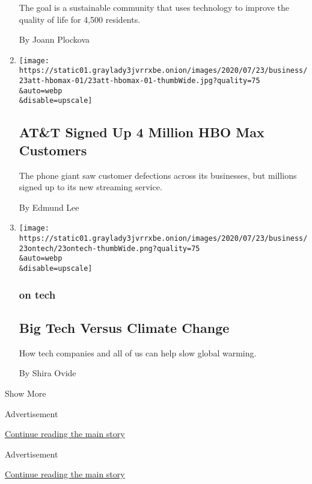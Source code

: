 \begin{enumerate}
  The goal is a sustainable community that uses technology to improve
  the quality of life for 4,500 residents.

  By Joann Plockova
\item
  \href{/2020/07/23/business/media/att-hbo-max.html}{}

  \texttt{[image: https://static01.graylady3jvrrxbe.onion/images/2020/07/23/business/23att-hbomax-01/23att-hbomax-01-thumbWide.jpg?quality=75\\\&auto=webp\\\&disable=upscale]}

  \hypertarget{att-signed-up-4-million-hbo-max-customers}{%
  \subsection{AT\&T Signed Up 4 Million HBO Max
  Customers}\label{att-signed-up-4-million-hbo-max-customers}}

  The phone giant saw customer defections across its businesses, but
  millions signed up to its new streaming service.

  By Edmund Lee
\item
  \href{/2020/07/23/technology/big-tech-climate-change.html}{}

  \texttt{[image: https://static01.graylady3jvrrxbe.onion/images/2020/07/23/business/23ontech/23ontech-thumbWide.png?quality=75\\\&auto=webp\\\&disable=upscale]}

  \hypertarget{on-tech-1}{%
  \subsubsection{on tech}\label{on-tech-1}}

  \hypertarget{big-tech-versus-climate-change}{%
  \subsection{Big Tech Versus Climate
  Change}\label{big-tech-versus-climate-change}}

  How tech companies and all of us can help slow global warming.

  By Shira Ovide
\end{enumerate}

Show More

Advertisement

\protect\hyperlink{after-mid2}{Continue reading the main story}

Advertisement

\protect\hyperlink{after-mktg}{Continue reading the main story}

